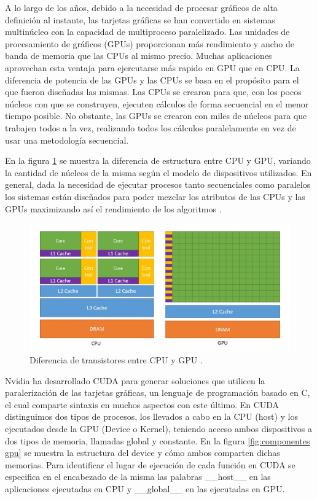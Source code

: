 \documentclass[11pt,a4paper,twoside,pdf]{article}
\numberwithin{equation}{section}
\begin{document}
A lo largo de los años, debido a la necesidad de procesar gráficos de alta definición al instante, las tarjetas gráficas se han convertido en sistemas multinúcleo con la capacidad de multiproceso paralelizado. Las unidades de procesamiento de gráficos (GPUs) proporcionan más rendimiento y ancho de banda de memoria que las CPUs al mismo precio. Muchas aplicaciones aprovechan esta ventaja para ejercutarse más rapido en GPU que en CPU. La diferencia de potencia de las GPUs y las CPUs se basa en el propósito para el que fueron diseñadas las mismas. Las CPUs se crearon para que, con los pocos núcleos con que se construyen, ejecuten cálculos de forma secuencial en el menor tiempo posible. No obstante, las GPUs se crearon con miles de núcleos para que trabajen todos a la vez, realizando todos los cálculos paralelamente en vez de usar una metodología secuencial.

En la figura \ref{fig:arquitectura-cpu-gpu} se muestra la diferencia de estructura entre CPU y GPU, variando la cantidad de núcleos de la misma según el modelo de dispositivos utilizados. En general, dada la necesidad de ejecutar procesos tanto secuenciales como paralelos los sistemas están diseñados para poder mezclar los atributos de las CPUs y las GPUs maximizando así el rendimiento de los algoritmos \cite{web}.

\begin{figure}[h]
\centering
\includegraphics[width=15cm]{Nvidia-CPU-GPU.jpg}				
\caption{Diferencia de transistores entre CPU y GPU \cite{web}. }
\label{fig:arquitectura-cpu-gpu}
\end{figure}
\noindent

Nvidia ha desarrollado CUDA para generar soluciones que utilicen la paralerización de las tarjetas gráficas, un lenguaje de programación basado en C, el cual comparte sintaxis en muchos aspectos con este último. En CUDA distinguimos dos tipos de procesos, los llevados a cabo en la CPU (host) y los ejecutados desde la GPU (Device o Kernel), teniendo acceso ambos dispositivos a dos tipos de memoria, llamadas global y constante. En la figura \ref{fig:componentes gpu} se muestra la estructura del device y cómo ambos comparten dichas memorias. Para identificar el lugar de ejecución de cada función en CUDA se especifica en el encabezado de la misma las palabras \_\_host\_\_ en las aplicaciones ejecutadas en CPU y \_\_global\_\_ en las ejecutadas en GPU.
\end{document}
